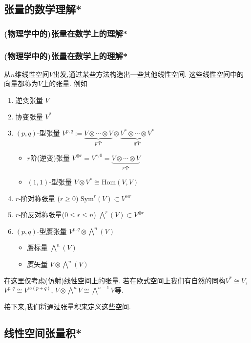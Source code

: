 \subsection{张量的数学理解*}


\subsubsection{(物理学中的)张量在数学上的理解*}
\begin{frame}\frametitle{(物理学中的)张量在数学上的理解*}
从$n$维线性空间$V$出发,通过某些方法构造出一些其他线性空间. 这些线性空间中的向量都称为$V$上的张量.
\pp
例如
\begin{enumerate}
\item 逆变张量 \hfill{$V$}
\pp
\item 协变张量 \hfill{$V^*$}
\pp
\item $(p,q)$-型张量  \hfill{$V^{p,q}:=\underbrace{V\otimes\cdots\otimes V}_{p\text{个}} \otimes \underbrace{V^*\otimes\cdots\otimes V^*}_{q\text{个}}$}
\begin{itemize}
\pp
\item $r$阶(逆变)张量 \hfill $V^{\otimes r}=V^{r,0}=\underbrace{V\otimes\cdots\otimes V}_{r\text{个}}$
\pp
\item  $(1,1)$-型张量  \hfill{$V\otimes V^* \cong \mathrm{Hom}(V,V)$}
\end{itemize}
\pp
\item $r$-阶对称张量 ($r\geq0$) \hfill{$\mathrm{Sym}^r(V)\subset V^{\otimes r}$}
\pp
\item $r$-阶反对称张量($0\leq r\leq n$) \hfill{$\bigwedge^r(V)\subset V^{\otimes r}$}
\pp
\item $(p,q)$-型赝张量 \hfill $V^{p,q}\otimes \bigwedge^n(V)$
\begin{itemize}
\pp
\item 赝标量 \hfill $\bigwedge^n(V)$
\pp
\item 赝矢量 \hfill $V\otimes \bigwedge^n(V)$
\end{itemize}
\end{enumerate}
\pp

 在这里仅考虑(仿射)线性空间上的张量. 若在欧式空间上我们有自然的同构$V^*\cong V$, $V^{p,q}\cong V^{\otimes(p+q)}$, $V\otimes\bigwedge^nV\cong\bigwedge^{n-1}V$等.
\pp

接下来,我们将通过张量积来定义这些空间.
\end{frame}



\subsection{线性空间张量积*}


